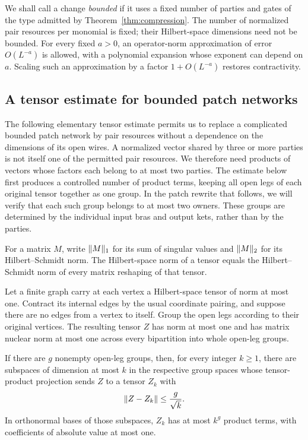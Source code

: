We shall call a change \emph{bounded} if it uses a fixed number of parties
and gates of the type admitted by Theorem~\ref{thm:compression}.  The number
of normalized pair resources per monomial is fixed; their Hilbert-space
dimensions need not be bounded.  For every fixed $a>0$, an operator-norm
approximation of error $O(L^{-a})$ is allowed, with a polynomial expansion
whose exponent can depend on $a$.  Scaling such an approximation by a
factor $1+O(L^{-a})$ restores contractivity.

\subsection{A tensor estimate for bounded patch networks}

The following elementary tensor estimate permits us to replace a complicated
bounded patch network by pair resources without a dependence on the
dimensions of its open wires.  A normalized vector shared by three or more
parties is not itself one of the permitted pair resources.  We therefore
need products of vectors whose factors each belong to at most two parties.
The estimate below first produces a controlled number of product terms,
keeping all open legs of each original tensor together as one group.
In the patch rewrite that follows, we will verify that each such group
belongs to at most two owners.  These groups are determined by the
individual input bras and output kets, rather than by the parties.

For a matrix $M$, write $\lVert M\rVert_1$ for its
sum of singular values and $\lVert M\rVert_2$ for its Hilbert--Schmidt norm.  The
Hilbert-space norm of a tensor equals the Hilbert--Schmidt norm of every
matrix reshaping of that tensor.

\begin{lemma}\label{lem:group-tensor}
Let a finite graph carry at each vertex a Hilbert-space tensor of norm at
most one.  Contract its internal edges by the usual coordinate pairing,
and suppose there are no edges from a vertex to itself.  Group the open
legs according to their original vertices.  The resulting tensor $Z$ has
norm at most one and has matrix nuclear norm at most one across every
bipartition into whole open-leg groups.

If there are $g$ nonempty open-leg groups, then, for every integer $k\ge1$,
there are subspaces of dimension at most $k$ in the respective group spaces
whose tensor-product projection sends $Z$ to a tensor $Z_k$ with
\begin{equation}\label{eq:group-truncation}
 \lVert Z-Z_k\rVert\le\frac{g}{\sqrt{k}}.
\end{equation}
In orthonormal bases of those subspaces, $Z_k$ has at most $k^g$ product
terms, with coefficients of absolute value at most one.
\end{lemma}

